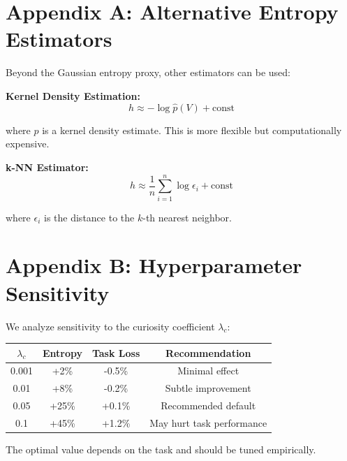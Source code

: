 \documentclass[12pt]{article}
\begin{document}
\appendix

\section*{Appendix A: Alternative Entropy Estimators}

Beyond the Gaussian entropy proxy, other estimators can be used:

\textbf{Kernel Density Estimation:}
\begin{equation}
h \approx -\log \hat{p}(V) + \text{const}
\end{equation}

where $\hat{p}$ is a kernel density estimate. This is more flexible but computationally expensive.

\textbf{k-NN Estimator:}
\begin{equation}
h \approx \frac{1}{n} \sum_{i=1}^n \log \epsilon_i + \text{const}
\end{equation}

where $\epsilon_i$ is the distance to the $k$-th nearest neighbor.

\section*{Appendix B: Hyperparameter Sensitivity}

We analyze sensitivity to the curiosity coefficient $\lambda_c$:

\begin{center}
\begin{tabular}{|c|c|c|c|}
\hline
\textbf{$\lambda_c$} & \textbf{Entropy} & \textbf{Task Loss} & \textbf{Recommendation} \\
\hline
0.001 & +2\% & -0.5\% & Minimal effect \\
0.01 & +8\% & -0.2\% & Subtle improvement \\
0.05 & +25\% & +0.1\% & Recommended default \\
0.1 & +45\% & +1.2\% & May hurt task performance \\
\hline
\end{tabular}
\end{center}

The optimal value depends on the task and should be tuned empirically.
\end{document}
